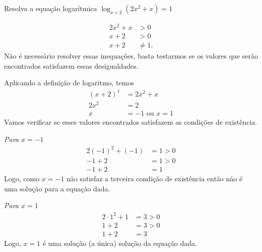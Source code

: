 \begin{example}
  Resolva a equação logarítmica
  \(
    \log_{x+2} \left( 2x^2 + x \right) = 1
  \)

  \solution
  \begin{align*}
    2x^2 + x & > 0      \\
    x+2      & > 0      \\
    x+2      & \neq 1.
  \end{align*}
  Não é necessário resolver essas inequações, basta testarmos se os
  valores que serão encontrados satisfazem essas desigualdades.

  Aplicando a definição de logaritmo, temos
  \begin{align*}
    (x+2)^1 & = 2x^2 + x \\
    2x^2    & = 2        \\
    x       & = -1 \text{ ou } x = 1
  \end{align*}
  Vamos verificar se esses valores encontrados satisfazem as
  condições de existência.

  \emph{Para $x=-1$}
  \begin{align*}
    2(-1)^2 + (-1) & = 1 > 0 \\
    -1+2           & = 1 > 0 \\
    -1+2           & = 1
  \end{align*}
  Logo, como $x=-1$ não satisfaz a terceira condição de existência
  então não é uma solução para a equação dada.

  \emph{Para $x=1$}
  \begin{align*}
    2 \cdot 1^2 + 1 & = 3 > 0 \\
    1+2             & = 3 > 0 \\
    1+2             & = 3
  \end{align*}
  Logo, $x=1$ é uma solução (a única) solução da equação dada.
\end{example}

